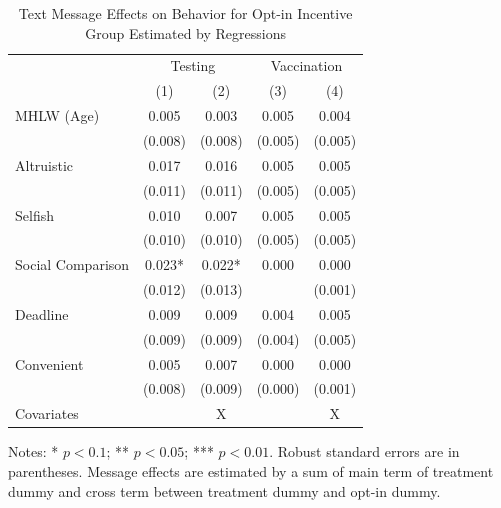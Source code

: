 \documentclass[
]{article}
\begin{document}
\begin{table}

\caption{\label{tab:lh-act}Text Message Effects on Behavior for Opt-in Incentive Group Estimated by Regressions}
\centering
\fontsize{9}{11}\selectfont
\begin{threeparttable}
\begin{tabular}[t]{lcccc}
\toprule
\multicolumn{1}{c}{ } & \multicolumn{2}{c}{Testing} & \multicolumn{2}{c}{Vaccination} \\
\cmidrule(l{3pt}r{3pt}){2-3} \cmidrule(l{3pt}r{3pt}){4-5}
  & (1) & (2) & (3) & (4)\\
\midrule
MHLW (Age) & \num{0.005} & \num{0.003} & \num{0.005} & \num{0.004}\\
 & (\num{0.008}) & (\num{0.008}) & (\num{0.005}) & (\num{0.005})\\
Altruistic & \num{0.017} & \num{0.016} & \num{0.005} & \num{0.005}\\
 & (\num{0.011}) & (\num{0.011}) & (\num{0.005}) & (\num{0.005})\\
Selfish & \num{0.010} & \num{0.007} & \num{0.005} & \num{0.005}\\
 & (\num{0.010}) & (\num{0.010}) & (\num{0.005}) & (\num{0.005})\\
Social Comparison & \num{0.023}* & \num{0.022}* & \num{0.000} & \num{0.000}\\
 & (\num{0.012}) & (\num{0.013}) &  & (\num{0.001})\\
Deadline & \num{0.009} & \num{0.009} & \num{0.004} & \num{0.005}\\
 & (\num{0.009}) & (\num{0.009}) & (\num{0.004}) & (\num{0.005})\\
Convenient & \num{0.005} & \num{0.007} & \num{0.000} & \num{0.000}\\
 & (\num{0.008}) & (\num{0.009}) & (\num{0.000}) & (\num{0.001})\\
Covariates &  & X &  & X\\
\bottomrule
\end{tabular}
\begin{tablenotes}
\item  Notes: * $p < 0.1$; ** $p < 0.05$; *** $p < 0.01$. Robust standard errors are in parentheses. Message effects are estimated by a sum of main term of treatment dummy and cross term between treatment dummy and opt-in dummy.
\end{tablenotes}
\end{threeparttable}
\end{table}
\end{document}
